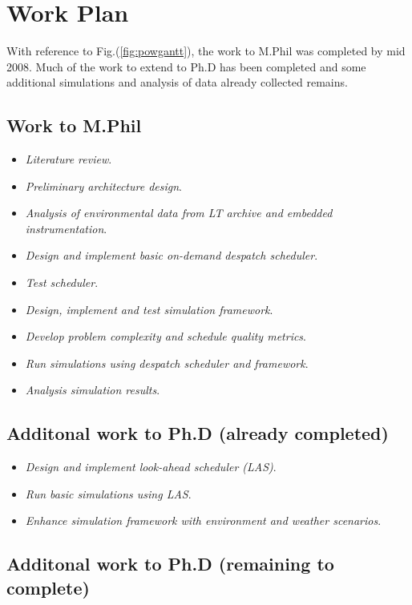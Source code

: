 \documentclass[12pt,a4paper]{article}
\begin{document}
{\newpage
\section{Work Plan}

With reference to Fig.(\ref{fig:powgantt}), the work to M.Phil was completed by mid 2008. Much of the work to extend to Ph.D has been completed and some additional simulations and analysis of data already collected remains.
\subsection{Work to M.Phil}
\begin{itemize}
\item \emph{Literature review}.
\item \emph{Preliminary architecture design}.
\item \emph{Analysis of environmental data from LT archive and embedded instrumentation}.
\item \emph{Design and implement basic on-demand despatch scheduler}.
\item \emph{Test scheduler}.
\item \emph{Design, implement and test simulation framework}.
\item \emph{Develop problem complexity and schedule quality metrics}.
\item \emph{Run simulations using despatch scheduler and framework}. 
\item \emph{Analysis simulation results}.
\end{itemize}

\subsection{Additonal work to Ph.D (already completed)}

\begin{itemize}
\item \emph{Design and implement look-ahead scheduler (LAS)}.
\item \emph{Run basic simulations using LAS}. 
\item \emph{Enhance simulation framework with environment and weather scenarios}. 
\end{itemize}

\subsection{Additonal work to Ph.D (remaining to complete)}

}
\end{document}
